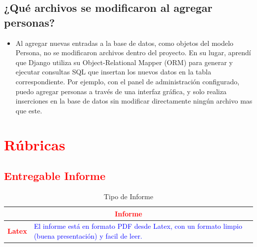 \documentclass{article}
\begin{document}
        \subsection{¿Qué archivos se modificaron al agregar personas?}
        \begin{itemize}	
            \item Al agregar nuevas entradas a la base de datos, como objetos del modelo Persona, no se modificaron archivos dentro del proyecto. En su lugar, aprendí que Django utiliza su Object-Relational Mapper (ORM) para generar y ejecutar consultas SQL que insertan los nuevos datos en la tabla correspondiente. Por ejemplo, con el panel de administración configurado, puedo agregar personas a través de una interfaz gráfica, y solo realiza inserciones en la base de datos sin modificar directamente ningún archivo mas que este.
        \end{itemize}



	\section{\textcolor{red}{Rúbricas}}
	
	\subsection{\textcolor{red}{Entregable Informe}}
	\begin{table}[H]
		\caption{Tipo de Informe}
		\setlength{\tabcolsep}{0.5em} %
		{\renewcommand{\arraystretch}{1.5}%
		\begin{tabular}{|p{3cm}|p{12cm}|}
			\hline
			\multicolumn{2}{|c|}{\textbf{\textcolor{red}{Informe}}}  \\
			\hline 
			\textbf{\textcolor{red}{Latex}} & \textcolor{blue}{El informe está en formato PDF desde Latex,  con un formato limpio (buena presentación) y facil de leer.}   \\ 
			\hline 	
		\end{tabular}
	}
	\end{table}
	
	\clearpage
	
\end{document}
